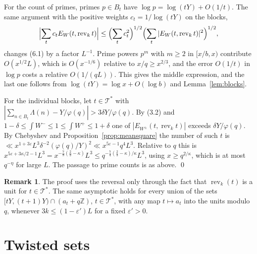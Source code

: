 \documentclass[11pt]{amsart}
\theoremstyle{definition}
\newtheorem{remark}[theorem]{Remark}
\numberwithin{equation}{section}
\newcommand{\rev}{\operatorname{rev}}
\newcommand{\cT}{\mathcal{T}}
\begin{document}
For the count of primes, primes $p\in B_t$ have $\log p=\log(tY)+O(1/t)$. The same argument with the positive weights $c_t=1/\log(tY)$ on the blocks,
\[
\Bigl|\sum_tc_tE_W(t,\rev_kt)\Bigr|\le\Bigl(\sum_tc_t^2\Bigr)^{1/2}\Bigl(\sum_t|E_W(t,\rev_kt)|^2\Bigr)^{1/2},
\]
changes (6.1) by a factor $L^{-1}$. Prime powers $p^m$ with $m\ge2$ in $[x/b,x)$ contribute $O(x^{1/2}L)$, which is $O(x^{-1/6})$ relative to $x/q\ge x^{2/3}$, and the error $O(1/t)$ in $\log p$ costs a relative $O(1/(qL))$. This gives the middle expression, and the last one follows from $\log(tY)=\log x+O(\log b)$ and Lemma~\ref{lem:blocks}.

For the individual blocks, let $t\in\cT^*$ with $|\sum_{n\in B_t}\Lambda(n)-Y/\varphi(q)|>3\delta Y/\varphi(q)$. By (3.2) and $1-\delta\le\int W^-\le1\le\int W^+\le1+\delta$ one of $|E_{W^\pm}(t,\rev_kt)|$ exceeds $\delta Y/\varphi(q)$. By Chebyshev and Proposition~\ref{prop:meansquare} the number of such $t$ is $\ll x^{1+3\varepsilon}L^3\delta^{-2}(\varphi(q)/Y)^2\ll x^{5\varepsilon-1}q^4L^3$. Relative to $q$ this is $x^{5\varepsilon+3\kappa/2-1}L^3=x^{-\frac78(\frac23-\kappa)}L^3\le q^{-\frac74(\frac23-\kappa)/\kappa}L^3$, using $x\ge q^{2/\kappa}$, which is at most $q^{-\eta}$ for large $L$. The passage to prime counts is as above. \qed

\begin{remark}\label{rem:coupling}
The proof uses the reversal only through the fact that $\rev_k(t)$ is a unit for $t\in\cT^*$. The same asymptotic holds for every union of the sets $[tY,(t+1)Y)\cap(a_t+q\mathbb Z)$, $t\in\cT^*$, with any map $t\mapsto a_t$ into the units modulo $q$, whenever $3k\le(1-\varepsilon')L$ for a fixed $\varepsilon'>0$.
\end{remark}

\section{Twisted sets}\label{sec:twists}
\end{document}
